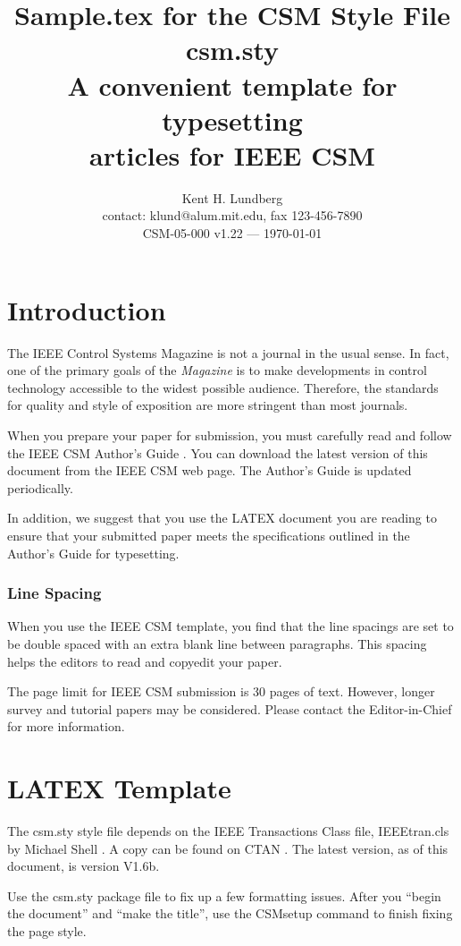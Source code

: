 \documentclass[letterpaper,12pt,peerreviewca,draftcls]{IEEEtran}
\title{Sample.tex for the CSM Style File csm.sty\\
A convenient template for typesetting\\[-2ex]
articles for IEEE CSM }
\author{Kent H. Lundberg \\[-2ex]
contact: klund@alum.mit.edu, fax 123-456-7890 \\[-2ex]
CSM-05-000 v1.22 --- \today}
\begin{document}
\maketitle
\CSMsetup

\section{Introduction}

The IEEE Control Systems Magazine is not a journal in the usual sense.
In fact, one of the primary goals of the {\it Magazine} is to make
developments in control technology accessible to the widest possible
audience.  Therefore, the standards for quality and style of exposition
are more stringent than most journals.


When you prepare your paper for submission, you must carefully read and
follow the IEEE CSM Author's Guide \cite{CSMguide}.  You can download
the latest version of this document from the IEEE CSM web page.  The
Author's Guide is updated periodically.


In addition, we suggest that you use the LATEX document you are reading
to ensure that your submitted paper meets the specifications outlined in
the Author's Guide for typesetting.


\subsubsection{Line Spacing}


When you use the IEEE CSM template, you find that the line spacings are
set to be double spaced with an extra blank line between paragraphs.
This spacing helps the editors to read and copyedit your paper.


The page limit for IEEE CSM submission is 30 pages of text.  However,
longer survey and tutorial papers may be considered.  Please contact the
Editor-in-Chief for more information.


\section{LATEX Template}


The csm.sty style file depends on the IEEE Transactions Class file,
IEEEtran.cls by Michael Shell \cite{IEEEtran}.  A copy can be found on
CTAN \cite{ctan}.  The latest version, as of this document, is version
V1.6b.

Use the csm.sty \cite{csm.sty} package file to fix up a few formatting
issues.  After you ``begin the document'' and ``make the title'', use
the CSMsetup command to finish fixing the page style.
\end{document}
